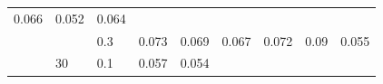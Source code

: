 \documentclass[12pt,oneside,a4paper]{reedthesis}
\begin{document}
\begin{longtable}[]{@{}lllllllll@{}}
\begin{minipage}[t]{0.08\columnwidth}
0.066\strut
\end{minipage} & \begin{minipage}[t]{0.08\columnwidth}\raggedright
0.052\strut
\end{minipage} & \begin{minipage}[t]{0.08\columnwidth}\raggedright
0.064\strut
\end{minipage}\tabularnewline
\begin{minipage}[t]{0.12\columnwidth}\raggedright
\strut
\end{minipage} & \begin{minipage}[t]{0.09\columnwidth}\raggedright
\strut
\end{minipage} & \begin{minipage}[t]{0.06\columnwidth}\raggedright
0.3\strut
\end{minipage} & \begin{minipage}[t]{0.08\columnwidth}\raggedright
0.073\strut
\end{minipage} & \begin{minipage}[t]{0.08\columnwidth}\raggedright
0.069\strut
\end{minipage} & \begin{minipage}[t]{0.08\columnwidth}\raggedright
0.067\strut
\end{minipage} & \begin{minipage}[t]{0.08\columnwidth}\raggedright
0.072\strut
\end{minipage} & \begin{minipage}[t]{0.08\columnwidth}\raggedright
0.09\strut
\end{minipage} & \begin{minipage}[t]{0.08\columnwidth}\raggedright
0.055\strut
\end{minipage}\tabularnewline
\begin{minipage}[t]{0.12\columnwidth}\raggedright
\strut
\end{minipage} & \begin{minipage}[t]{0.09\columnwidth}\raggedright
30\strut
\end{minipage} & \begin{minipage}[t]{0.06\columnwidth}\raggedright
0.1\strut
\end{minipage} & \begin{minipage}[t]{0.08\columnwidth}\raggedright
0.057\strut
\end{minipage} & \begin{minipage}[t]{0.08\columnwidth}\raggedright
0.054\strut
\end{minipage} & \begin{minipage}[t]{0.08\columnwidth}\raggedright

\end{minipage}
\end{longtable}
\end{document}
